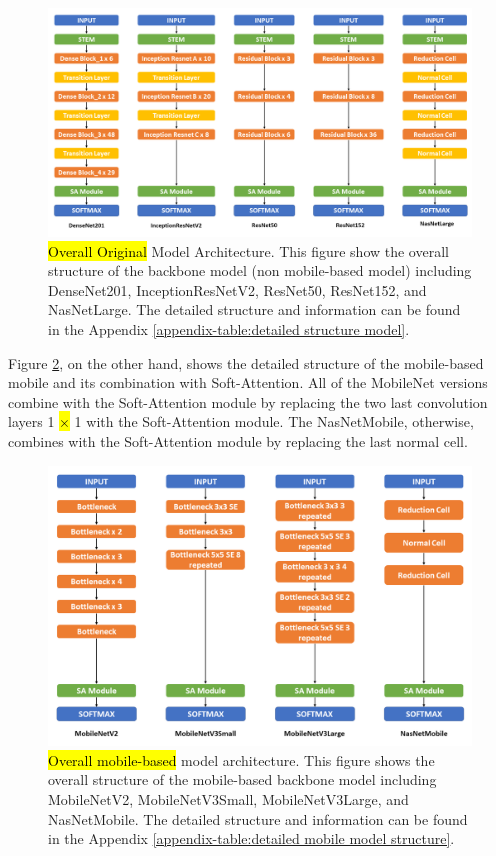 \documentclass[sensors,article,accept,pdftex,moreauthors]{Definitions/mdpi}
\begin{document}
	\begin{figure}[H]
		\includegraphics[width=0.7\linewidth]{Definitions/Model Structure}
		\caption{\hl{Overall Original} %
 Model Architecture. This figure show the overall structure of the backbone model (non mobile-based model) including DenseNet201, InceptionResNetV2, ResNet50, ResNet152, and NasNetLarge. The detailed structure and information can be found in the Appendix \ref{appendix-table:detailed structure model}.}
		\label{fig:model-structure}
	\end{figure}
	
	Figure \ref{fig:mobile-model-structure}, on the other hand, shows the detailed structure of the mobile-based mobile and its combination with Soft-Attention. All of the MobileNet versions combine with the Soft-Attention module by replacing the two last convolution layers 1 \hl{$\times$} %
 1 with the Soft-Attention module. The NasNetMobile, otherwise, combines with the Soft-Attention module by replacing the last normal cell. 
	\begin{figure}[H]
		\includegraphics[width=1\linewidth]{Definitions/Mobile Model Structure}
		\caption{\hl{Overall mobile-based} %
 model architecture. This figure shows the overall structure of the mobile-based backbone model including MobileNetV2, MobileNetV3Small, MobileNetV3Large, and NasNetMobile. The detailed structure and information can be found in the Appendix \ref{appendix-table:detailed mobile model structure}.}
		\label{fig:mobile-model-structure}
	\end{figure}
	
\end{document}
